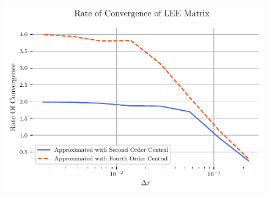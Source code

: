 \documentclass{article}
\begin{document}
\begin{figure}
    \centering
    \includegraphics[width=\textwidth]{tex-outputs/MMS1_LEE_ROC.pdf}
\end{figure}
\end{document}
